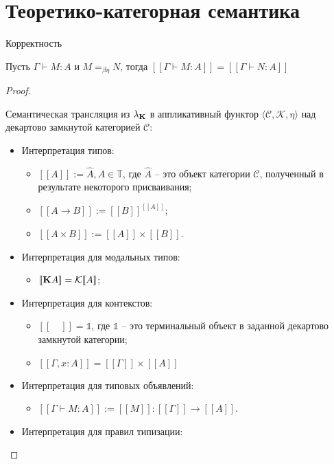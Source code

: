 \section{Теоретико-категорная семантика}

\begin{theorem} Корректность

  Пусть $\Gamma \vdash M : A$ и $M =_{\beta\eta} N$, тогда $[\![\Gamma \vdash M : A]\!] = [\![\Gamma \vdash N : A]\!]$
\end{theorem}

\begin{proof}

\begin{defin} Семантическая трансляция из $\lambda_{{\bf K}}$ в аппликативный функтор $\langle \mathcal{C}, \mathcal{K}, \eta \rangle$ над декартово замкнутой категорией $\mathcal{C}$:

\begin{itemize}
\item Интерпретация типов:
  \begin{itemize}
    \item $[\![A]\!] := \hat{A}, A \in \mathbb{T}$, где $\hat{A}$ -- это объект категории $\mathcal{C}$, полученный в результате некоторого присваивания;
    \item $[\![A \to B]\!] := [\![B]\!]^{[\![A]\!]}$;
    \item $[\![A \times B]\!] := [\![A]\!] \times [\![B]\!]$.
  \end{itemize}
\item Интерпретация для модальных типов:
  \begin{itemize}
    \item $[\![{\bf K}A]\!] = \mathcal{K}[\![A]\!]$;
  \end{itemize}
\item Интерпретация для контекстов:
  \begin{itemize}
    \item $[\![ \quad ]\!] = \mathds{1}$, где $\mathds{1}$ -- это терминальный объект в заданной декартово замкнутой категории;
    \item $[\![\Gamma, x : A]\!] = [\![\Gamma]\!] \times [\![A]\!]$
  \end{itemize}
\item Интерпретация для типовых объявлений:
  \begin{itemize}
    \item $[\![\Gamma \vdash M : A]\!] := [\![M]\!] : [\![\Gamma]\!] \to [\![A]\!]$.
  \end{itemize}
\item Интерпретация для правил типизации:


\end{itemize}
\end{defin}
\end{proof}

